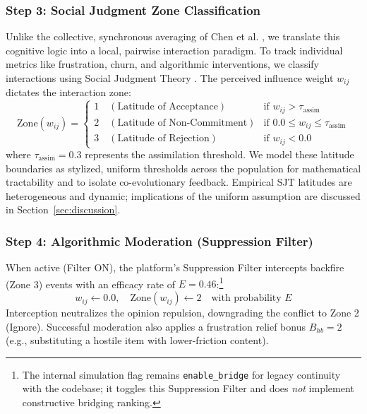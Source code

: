 \subsubsection{Step 3: Social Judgment Zone Classification}
Unlike the collective, synchronous averaging of Chen et al. \citep{Chen2021}, we translate this cognitive logic into a local, pairwise interaction paradigm. To track individual metrics like frustration, churn, and algorithmic interventions, we classify interactions using Social Judgment Theory \citep{Sherif1961, Jager2005}. The perceived influence weight $w_{ij}$ dictates the interaction zone:
\begin{equation}
    \text{Zone}(w_{ij}) = \begin{cases}
        1 \quad (\text{Latitude of Acceptance}) & \text{if } w_{ij} > \tau_{\text{assim}} \\
        2 \quad (\text{Latitude of Non-Commitment}) & \text{if } 0.0 \leq w_{ij} \leq \tau_{\text{assim}} \\
        3 \quad (\text{Latitude of Rejection}) & \text{if } w_{ij} < 0.0
    \end{cases}
\end{equation}
where $\tau_{\text{assim}} = 0.3$ represents the assimilation threshold. We model these latitude boundaries as stylized, uniform thresholds across the population for mathematical tractability and to isolate co-evolutionary feedback. Empirical SJT latitudes are heterogeneous and dynamic; implications of the uniform assumption are discussed in Section~\ref{sec:discussion}.

\subsubsection{Step 4: Algorithmic Moderation (Suppression Filter)}
When active (Filter ON), the platform's Suppression Filter intercepts backfire (Zone 3) events with an efficacy rate of $E = 0.46$:\footnote{The internal simulation flag remains \texttt{enable\_bridge} for legacy continuity with the codebase; it toggles this Suppression Filter and does \emph{not} implement constructive bridging ranking.}
\begin{equation}
    w_{ij} \leftarrow 0.0, \quad \text{Zone}(w_{ij}) \leftarrow 2 \quad \text{with probability } E
\end{equation}
Interception neutralizes the opinion repulsion, downgrading the conflict to Zone 2 (Ignore). Successful moderation also applies a frustration relief bonus $B_{hb} = 2$ (e.g., substituting a hostile item with lower-friction content).

